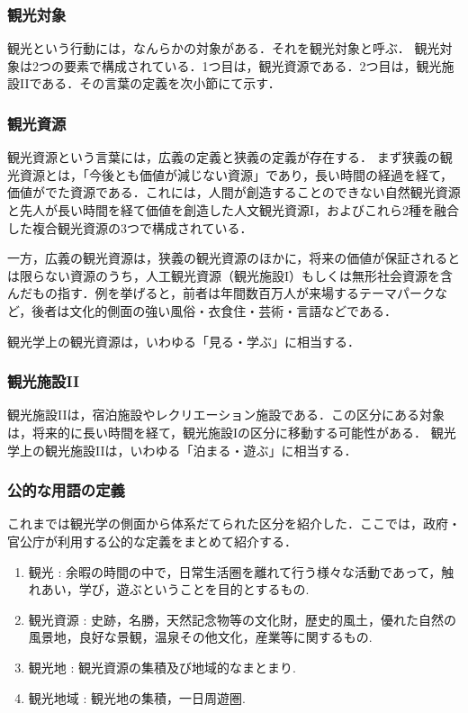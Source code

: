 \documentclass{jsarticle}
\begin{document}
\subsubsection{観光対象}

観光という行動には，なんらかの対象がある．それを観光対象と呼ぶ\cite{yokomizo_1998}．
観光対象は2つの要素で構成されている．1つ目は，観光資源である．2つ目は，観光施設IIである．その言葉の定義を次小節にて示す．

\subsubsection{観光資源}

観光資源という言葉には，広義の定義と狭義の定義が存在する．
まず狭義の観光資源とは，「今後とも価値が減じない資源」であり，長い時間の経過を経て，価値がでた資源である．これには，人間が創造することのできない自然観光資源と先人が長い時間を経て価値を創造した人文観光資源I，およびこれら2種を融合した複合観光資源の3つで構成されている．

一方，広義の観光資源は，狭義の観光資源のほかに，将来の価値が保証されるとは限らない資源のうち，人工観光資源（観光施設I）もしくは無形社会資源を含んだもの指す．例を挙げると，前者は年間数百万人が来場するテーマパークなど，後者は文化的側面の強い風俗・衣食住・芸術・言語などである．

観光学上の観光資源は，いわゆる「見る・学ぶ」に相当する．

\subsubsection{観光施設II}

観光施設IIは，宿泊施設やレクリエーション施設である．この区分にある対象は，将来的に長い時間を経て，観光施設Iの区分に移動する可能性がある．
観光学上の観光施設IIは，いわゆる「泊まる・遊ぶ」に相当する．


\subsubsection{公的な用語の定義}

これまでは観光学の側面から体系だてられた区分を紹介した．ここでは，政府・官公庁が利用する公的な定義をまとめて紹介する．

\begin{enumerate}
\item 観光      : 余暇の時間の中で，日常生活圏を離れて行う様々な活動であって，触れあい，学び，遊ぶということを目的とするもの\cite{toshin_1995}.
\item 観光資源  : 史跡，名勝，天然記念物等の文化財，歴史的風土，優れた自然の風景地，良好な景観，温泉その他文化，産業等に関するもの\cite{tourism_law_2007}.
\item 観光地    : 観光資源の集積及び地域的なまとまり\cite{tourism_kensetsu_1974}.
\item 観光地域  : 観光地の集積，一日周遊圏\cite{tourism_kensetsu_1974}.
\end{enumerate}
\end{document}
